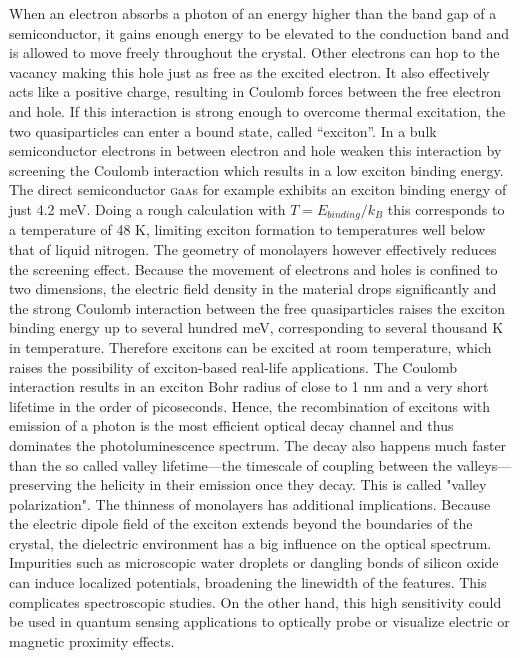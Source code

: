 When an electron absorbs a photon of an energy higher than the band gap of a semiconductor, it gains enough energy to be elevated to the conduction band and is allowed to move freely throughout the crystal. Other electrons can hop to the vacancy making this hole just as free as the excited electron. It also effectively acts like a positive charge, resulting in Coulomb forces between the free electron and hole. If this interaction is strong enough to overcome thermal excitation, the two quasiparticles can enter a bound state, called ``exciton''. In a bulk semiconductor electrons in between electron and hole weaken this interaction by screening the Coulomb interaction which results in a low exciton binding energy. The direct semiconductor \textsc{g}a\textsc{a}s for example exhibits an exciton binding energy of just 4.2 meV\cite{pelant_luminescence_2012}. Doing a rough calculation with $T=E_{binding}/k_B$ this corresponds to a temperature of 48 K, limiting exciton formation to temperatures well below that of liquid nitrogen.
The geometry of \tmdg monolayers however effectively reduces the screening effect. Because the movement of electrons and holes is confined to two dimensions, the electric field density in the material drops significantly and the strong Coulomb interaction between the free quasiparticles raises the exciton binding energy up to several hundred meV\cite{chernikov_exciton_2014, hanbicki_measurement_2015, he_tightly_2014}, corresponding to several thousand K in temperature. Therefore excitons can be excited at room temperature, which raises the possibility of exciton-based real-life applications. The Coulomb interaction results in an exciton Bohr radius of close to 1 nm and a very short lifetime in the order of picoseconds\cite{palummo_exciton_2015}. Hence, the recombination of excitons with emission of a photon is the most efficient optical decay channel and thus dominates the photoluminescence spectrum.
The decay also happens much faster than the so called valley lifetime---the timescale of coupling between the valleys---preserving the helicity in their emission once they decay. This is called "valley polarization".
The thinness of \tmdg monolayers has additional implications. Because the electric dipole field of the exciton extends beyond the boundaries of the crystal, the dielectric environment has a big influence on the optical spectrum\cite{stier_probing_2016, borghardt_engineering_2017, jakubczyk_impact_2018}. Impurities such as microscopic water droplets or dangling bonds of silicon oxide can induce localized potentials, broadening the linewidth of the \pl features. This complicates spectroscopic studies. On the other hand, this high sensitivity could be used in quantum sensing applications to optically probe or visualize electric or magnetic proximity effects\cite{peng_valley_2017, zhao_enhanced_2017, smolenski_tuning_2016, neumann_opto-valleytronic_2017}.


